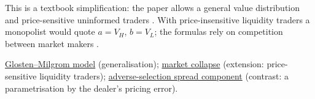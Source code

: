\begin{qfresult}
 This is a textbook simplification: the paper allows a general value distribution and price-sensitive uninformed traders \citep[sec.~II, pp.~3--6]{glosten-milgrom-1983}. With price-insensitive liquidity traders a monopolist would quote $a=V_H$, $b=V_L$; the formulas rely on competition between market makers \citep[chap.~``A Primer on the Microstructure of Financial Markets'', p.~35]{crypto-cartea}.

 \hyperref[mod:glosten-milgrom]{Glosten--Milgrom model} (generalisation); \hyperref[res:glosten-milgrom-market-collapse]{market collapse} (extension: price-sensitive liquidity traders); \hyperref[res:adverse-selection-spread-component]{adverse-selection spread component} (contrast: a parametrisation by the dealer's pricing error).

\end{qfresult}

